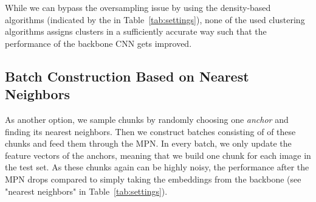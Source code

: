 \documentclass{article}
\begin{document}
While we can bypass the oversampling issue by using the density-based algorithms (indicated by the  in Table~\ref{tab:settings}), none of the used clustering algorithms assigns clusters in a sufficiently accurate way such that the performance of the backbone CNN gets improved. 

\begin{table}[hbt!]
\centering
{}
\caption{Performance of different settings of using the MPN during test time as well as the performance of teacher student approaches.  indicates clustering algorithms that need a fixed number of clusters (900 clusters), * indicates density-based clustering algorithms (eps=0.9, min sample=5)}
\label{tab:settings}
\vspace{0.3cm}
\end{table} 

\subsection{Batch Construction Based on Nearest Neighbors}
As another option, we sample chunks by randomly choosing one \textit{anchor} and finding its  nearest neighbors. Then we construct batches consisting of  of these chunks and feed them through the MPN. In every batch, we only update the feature vectors of the anchors, meaning that we build one chunk for each image in the test set. As these chunks again can be highly noisy, the performance after the MPN drops compared to simply taking the embeddings from the backbone (see "nearest neighbors" in Table~\ref{tab:settings}).
\end{document}
